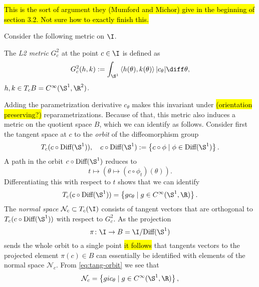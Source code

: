 \hl{This is the sort of argument they (Mumford and Michor) give in the
  beginning of section 3.2. Not sure how to exactly finish this.}

Consider the following metric on $\I$.

\begin{definition}
  The \textit{L2 metric} $G^2_c$ at the point $c \in \I$ is defined as
  \begin{equation*}
    G^2_c(h,k) := \int_{\S^{1}} \left\langle{h(\theta)
    , k(\theta)}\right\rangle |c_{\theta}| \diff \theta,
  \end{equation*}
  $h,k \in T_cB = C^{\infty}(\S^1,\R^2)$.
\end{definition}

Adding the parametrization derivative $c_{\theta}$ makes this
invariant under \hl{(orientation preserving?)}
reparametrizations. Because of that, this metric also induces a metric
on the quotient space $B$, which we can identify as follows. Consider
first the tangent space at $c$ to the \textit{orbit} of the diffeomorphism
group
\begin{equation*}
  T_c(c \circ \text{Diff}(\S^{1})), \quad c \circ
  \text{Diff}(\S^{1}) :=
  \left\{
    c \circ \phi \mid \phi \in \text{Diff}(\S^{1})
  \right\} .
\end{equation*}
A path in the orbit $c \circ \text{Diff}(\S^{1})$ reduces to
\begin{equation*}
  t \mapsto
  \left(
    \theta \mapsto (c \circ \phi_t) (\theta)
\right).
\end{equation*}
Differentiating this with respect to $t$ shows that we can identify
\begin{equation}
  \label{eq:tang-orbit}
  T_c(c \circ \text{Diff}(\S^{1})) =
  \left\{
    g c_{\theta} \mid g \in C^{\infty}(\S^1, \R)
  \right\}.
\end{equation}
The \textit{normal space} $\mathcal{N}_c \subset T_c(\I)$ consists of
tangent vectors that are orthogonal to $T_c(c \circ
\text{Diff}(\S^{1}))$ with respect to $G_c^2$. As the projection
\begin{equation*}
  \pi \colon \I \rightarrow B = \I/\text{Diff}(\S^{1})
\end{equation*}
sends the whole orbit to a single point \hl{it follows} that tangents
vectors to the projected element $\pi(c) \in B$ can essentially
be identified with elements of the normal space $\mathcal{N}_c$.
From \eqref{eq:tang-orbit} we see that
\begin{equation*}
  \mathcal{N}_c =
  \left\{
    g i c_{\theta} \mid g \in C^{\infty}(\S^1, \R)
  \right\},
\end{equation*}

